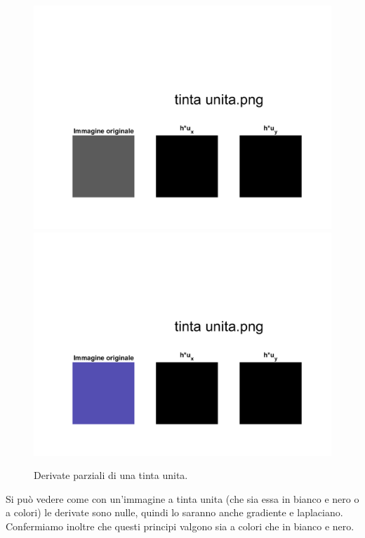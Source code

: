 \begin{figure}[htb] 
\centering
\includegraphics[scale=0.4, trim = 0 0 0 10.5cm, clip]{Pictures/Risultati/tinta unita bianco e nero derivate parziali.png}
\includegraphics[scale=0.4, trim = 0 0 0 10.5cm, clip]{Pictures/Risultati/tinta unita derivate parziali.png}
\caption{Derivate parziali di una tinta unita.}\label{fig:figura}
\end{figure}

Si può vedere come con un'immagine a tinta unita (che sia essa in bianco e nero o a colori) le derivate sono nulle, quindi lo saranno anche gradiente e laplaciano. Confermiamo inoltre che questi principi valgono sia a colori che in bianco e nero.\\

